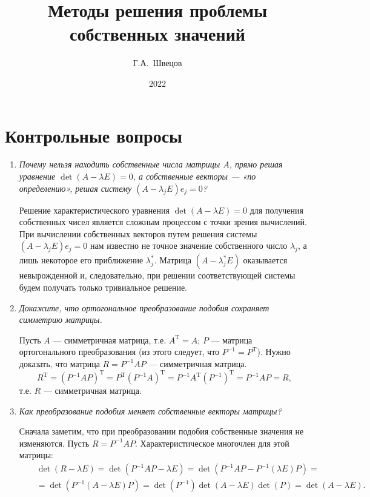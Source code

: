 \documentclass[12pt, a4paper]{article}
\title{Методы решения проблемы собственных значений}
\author{Г.А.~Швецов}
\date{2022}
\begin{document}
	\newcommand{\pl}{\partial}
	\maketitle
	
	\tableofcontents
	
	\newpage
	
	\section{Контрольные вопросы}
	\begin{enumerate}
		\item \textit{Почему нельзя находить собственные числа матрицы $A$, прямо решая уравнение $\det (A-\lambda E) = 0$, а собственные векторы --- «по определению», решая систему $(A - \lambda_j E)e_j =0$?}
		
		Решение характеристического уравнения $\det (A-\lambda E) = 0$ для получения собственных чисел является сложным процессом с точки зрения вычислений. При вычислении собственных векторов путем решения системы $(A - \lambda_j E)e_j =0$ нам известно не точное значение собственного число $\lambda_j$, а лишь некоторое его приближение $\lambda_j^*$. Матрица $(A - \lambda_j^* E)$ оказывается невырожденной и, следовательно, при решении соответствующей системы будем получать только тривиальное решение.
		\smallskip
		
		\item \textit{Докажите, что ортогональное преобразование подобия сохраняет симметрию матрицы.}
		
		Пусть $A$ --- симметричная матрица, т.е. $A^\textrm{T} = A$; $P$ --- матрица ортогонального преобразования (из этого следует, что $P^{-1} = P^\textrm{T}$). Нужно доказать, что матрица $R = P^{-1} A P$ ---  симметричная матрица.
		\[
		R^{\textrm{T}} = (P^{-1} A P)^\textrm{T} = P^\textrm{T} (P^{-1} A)^\textrm{T} = P^{-1} A^\textrm{T} (P^{-1})^\textrm{T} = P^{-1} A P = R,
		\]
		т.е. $R$ --- симметричная матрица.
		
		\smallskip
		
		
		\item \textit{Как преобразование подобия меняет собственные векторы матрицы?}
		
		Сначала заметим, что при преобразовании подобия собственные значения не изменяются. Пусть $R = P^{-1} A P$. Характеристическое многочлен для этой матрицы:
		\begin{eqnarray*}
			&& \det(R - \lambda E) = \det(P^{-1} A P - \lambda E) = \det(P^{-1} A P - P^{-1}(\lambda E) P) = \\
			&& = \det(P^{-1}(A - \lambda E) P) = \det(P^{-1}) \det(A - \lambda E) \det(P) = \det(A - \lambda E).
		\end{eqnarray*}
		

\end{enumerate}
\end{document}
